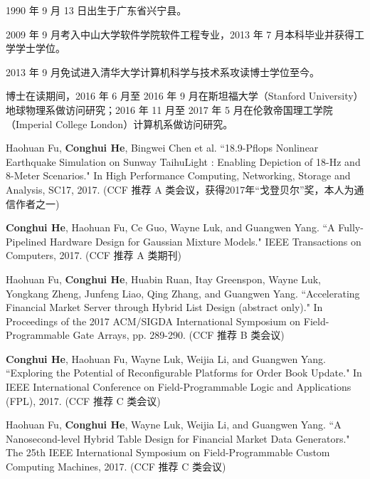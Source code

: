 \begin{resume}


  1990 年 9 月 13 日出生于广东省兴宁县。

  2009 年 9 月考入中山大学软件学院软件工程专业，2013 年 7 月本科毕业并获得工学学士学位。

  2013 年 9 月免试进入清华大学计算机科学与技术系攻读博士学位至今。

  博士在读期间，2016 年 6 月至 2016 年 9 月在斯坦福大学（Stanford University）地球物理系做访问研究；2016 年 11 月至 2017 年 5 月在伦敦帝国理工学院（Imperial College London）计算机系做访问研究。


  \begin{publications}
    \item Haohuan Fu, \textbf{Conghui He}, Bingwei Chen et al. ``18.9-Pflops Nonlinear Earthquake Simulation on Sunway TaihuLight : Enabling Depiction of 18-Hz and 8-Meter Scenarios." In High Performance Computing, Networking, Storage and Analysis, SC17, 2017. (CCF 推荐 A 类会议，获得2017年“戈登贝尔”奖，本人为通信作者之一)

    \item \textbf{Conghui He}, Haohuan Fu, Ce Guo, Wayne Luk, and Guangwen Yang. ``A Fully-Pipelined Hardware Design for Gaussian Mixture Models." IEEE Transactions on Computers, 2017. (CCF 推荐 A 类期刊)

    \item Haohuan Fu, \textbf{Conghui He}, Huabin Ruan, Itay Greenspon, Wayne Luk, Yongkang Zheng, Junfeng Liao, Qing Zhang, and Guangwen Yang. ``Accelerating Financial Market Server through Hybrid List Design (abstract only)." In Proceedings of the 2017 ACM/SIGDA International Symposium on Field-Programmable Gate Arrays, pp. 289-290. (CCF 推荐 B 类会议)

    \item \textbf{Conghui He}, Haohuan Fu, Wayne Luk, Weijia Li, and Guangwen Yang. ``Exploring the Potential of Reconfigurable Platforms for Order Book Update." In IEEE International Conference on Field-Programmable Logic and Applications (FPL), 2017. (CCF 推荐 C 类会议)

    \item Haohuan Fu, \textbf{Conghui He}, Wayne Luk, Weijia Li, and Guangwen Yang. ``A Nanosecond-level Hybrid Table Design for Financial Market Data Generators." The 25th IEEE International Symposium on Field-Programmable Custom Computing Machines, 2017. (CCF 推荐 C 类会议)


\end{publications}
\end{resume}
